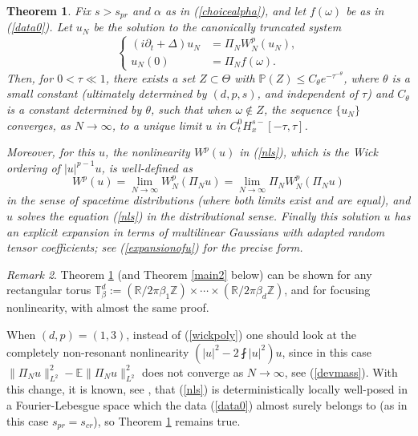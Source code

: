 \documentclass[11 pt,reqno]{amsart}
\newtheorem{thm}{Theorem}[section]
\theoremstyle{definition}
\theoremstyle{remark}
\newtheorem{rem}[thm]{Remark}
\numberwithin{equation}{section}
\newcommand{\Tb}{\mathbb{T}}
\newcommand{\Rb}{\mathbb{R}}
\newcommand{\Eb}{\mathbb{E}}
\newcommand{\Zb}{\mathbb{Z}}
\newcommand{\Pb}{\mathbb{P}}
\begin{document}
 \begin{thm}\label{main} Fix $s>s_{pr}$ and $\alpha$ as in (\ref{choicealpha}), and let $f(\omega)$ be as in (\ref{data0}). Let $u_N$ be the solution to the canonically truncated system \begin{equation}\label{nlstrunc}
\left\{
\begin{aligned}(i\partial_t+\Delta)u_N&=\Pi_NW_N^{p}(u_N),\\
u_N(0)&=\Pi_Nf(\omega).
\end{aligned}
\right.
\end{equation} Then, for $0<\tau\ll 1$, there exists a set $Z\subset\Theta$ with $\Pb(Z)\leq C_\theta e^{-\tau^{-\theta}}$, where $\theta$ is a small constant (ultimately determined by $(d,p,s)$, and independent of $\tau$) and $C_\theta$ is a constant determined by $\theta$, such that when $\omega\not\in Z$, the sequence $\{u_N\}$ converges, as $N\to\infty$, to a unique limit $u$ in $C_t^0H_x^{s-}[-\tau,\tau]$.

Moreover, for this $u$, the nonlinearity $W^p(u)$ in (\ref{nls}), which is the Wick ordering of $|u|^{p-1}u$, is well-defined as
\begin{equation}\label{wickpoly2}W^p(u)=\lim_{N\to\infty}W_N^p(\Pi_Nu)=\lim_{N\to\infty}\Pi_NW_N^p(\Pi_Nu)
\end{equation} in the sense of spacetime distributions (where both limits exist and are equal), and $u$ solves the equation (\ref{nls}) in the distributional sense. Finally this solution $u$ has an explicit expansion in terms of multilinear Gaussians with adapted random tensor coefficients; see (\ref{expansionofu}) for the precise form.
\end{thm}
  \begin{rem}\label{1dcubic} Theorem \ref{main} (and Theorem \ref{main2} below) can be shown for any rectangular torus $\Tb_\beta^d:=(\Rb/2\pi\beta_1\Zb)\times\cdots\times(\Rb/2\pi\beta_d\Zb)$, and for focusing nonlinearity, with almost the same proof.   
  
When $(d,p)=(1,3)$, instead of (\ref{wickpoly}) one should look at the completely non-resonant nonlinearity $(|u|^2-2\fint |u|^2)u$, since in this case $\|\Pi_Nu\|_{L^2}^2-\Eb\|\Pi_Nu\|_{L^2}^2$ does not converge as $N\to\infty$, see (\ref{devmass}). With this change, it is known, see \cite{GrH}, that (\ref{nls}) is deterministically locally well-posed in a Fourier-Lebesgue space which the data (\ref{data0}) almost surely belongs to (as in this case $s_{pr}=s_{cr}$), so Theorem \ref{main} remains true.
 \end{rem}
\end{document}
